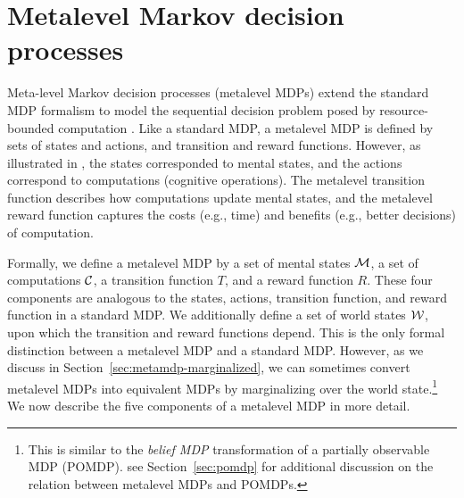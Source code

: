 \section{Metalevel Markov decision processes}\label{sec:metalevel-mdps}


Meta-level Markov decision processes (metalevel MDPs) extend the standard MDP formalism to model the sequential decision problem posed by resource-bounded computation \citep{hay2012selecting}. Like a standard MDP, a metalevel MDP is defined by sets of states and actions, and transition and reward functions. However, as illustrated in , the states corresponded to mental states, and the actions correspond to computations (cognitive operations). The metalevel transition function describes how computations update mental states, and the metalevel reward function captures the costs (e.g., time) and benefits (e.g., better decisions) of computation.

Formally, we define a metalevel MDP by a set of mental states $\mathcal{M}$, a set of computations $\mathcal{C}$, a transition function $T$, and a reward function $R$. These four components are analogous to the states, actions, transition function, and reward function in a standard MDP. We additionally define a set of world states $\mathcal{W}$, upon which the transition and reward functions depend. This is the only formal distinction between a metalevel MDP and a standard MDP. However, as we discuss in Section~\ref{sec:metamdp-marginalized}, we can sometimes convert metalevel MDPs into equivalent MDPs by marginalizing over the world state.\footnote{%
  This is similar to the \emph{belief MDP} transformation of a partially observable MDP (POMDP). see Section~\ref{sec:pomdp} for additional discussion on the relation between metalevel MDPs and POMDPs.
} We now describe the five components of a metalevel MDP in more detail.



